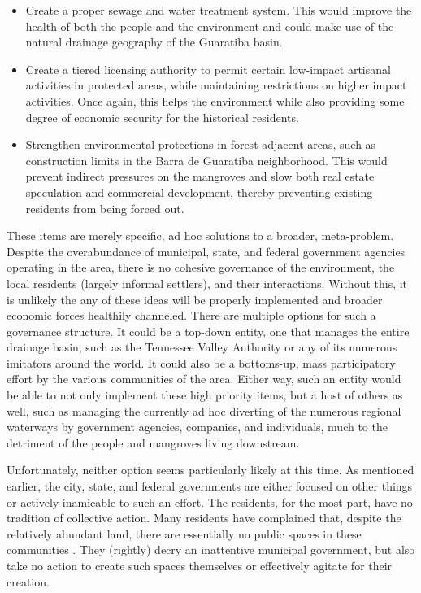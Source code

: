 \begin{itemize}[itemsep=0pt,parsep=0pt]
	\item{Create a proper sewage and water treatment system. This would improve the health of both the people and the environment and could make use of the natural drainage geography of the Guaratiba basin.}
	\item{Create a tiered licensing authority to permit certain low-impact artisanal activities in protected areas, while maintaining restrictions on higher impact activities. Once again, this helps the environment while also providing some degree of economic security for the historical residents.}
	\item{Strengthen environmental protections in forest-adjacent areas, such as construction limits in the Barra de Guaratiba neighborhood. This would prevent indirect pressures on the mangroves and slow both real estate speculation and commercial development, thereby preventing existing residents from being forced out. }
\end{itemize}

These items are merely specific, ad hoc solutions to a broader, meta-problem. Despite the overabundance of municipal, state, and federal government agencies operating in the area, there is no cohesive governance of the environment, the local residents (largely informal settlers), and their interactions. Without this, it is unlikely the any of these ideas will be properly implemented and broader economic forces healthily channeled. There are multiple options for such a governance structure. It could be a top-down entity, one that manages the entire drainage basin, such as the Tennessee Valley Authority or any of its numerous imitators around the world. It could also be a bottoms-up, mass participatory effort by the various communities of the area. Either way, such an entity would be able to not only implement these high priority items, but a host of others as well, such as managing the currently ad hoc diverting of the numerous regional waterways by government agencies, companies, and individuals, much to the detriment of the people and mangroves living downstream.

Unfortunately, neither option seems particularly likely at this time. As mentioned earlier, the city, state, and federal governments are either focused on other things or actively inamicable to such an effort. The residents, for the most part, have no tradition of collective action. Many residents have complained that, despite the relatively abundant land, there are essentially no public spaces in these communities \cite{herzogGuaratibaVerdeSubsidios2009}. They (rightly) decry an inattentive municipal government, but also take no action to create such spaces themselves or effectively agitate for their creation. 

